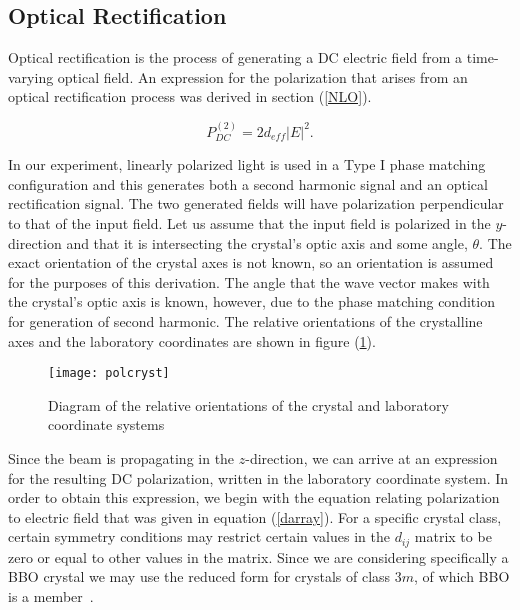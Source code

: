 \subsection{Optical Rectification}

Optical rectification is the process of generating a DC electric
field from a time-varying optical field.  An expression for the
polarization that arises from an optical rectification process was
derived in section (\ref{NLO}).

\begin{equation}\label{ORpol}
P_{DC}^{(2)}=2d_{eff} \left| E\right|^2.
\end{equation}

In our experiment, linearly polarized light is used in a Type I
phase matching configuration and this generates both a second
harmonic signal and an optical rectification signal.  The two
generated fields will have polarization perpendicular to that of
the input field. Let us assume that the input field is polarized
in the $y$-direction and that it is intersecting the crystal's
optic axis and some angle, $\theta$.  The exact orientation of the
crystal axes is not known, so an orientation is assumed for the
purposes of this derivation.  The angle that the wave vector makes
with the crystal's optic axis is known, however, due to the phase
matching condition for generation of second harmonic.  The
relative orientations of the crystalline axes and the laboratory
coordinates are shown in figure (\ref{crysorient}).

\begin{figure}
\texttt{[image: polcryst]}
\caption[Relative orientation of crystal and laboratory coordinate
systems]{Diagram of the relative orientations of the crystal and
laboratory coordinate systems}
\label{crysorient}%
\end{figure}

Since the beam is propagating in the $z$-direction, we can arrive
at an expression for the resulting DC polarization, written in the
laboratory coordinate system.  In order to obtain this expression,
we begin with the equation relating polarization to electric field
that was given in equation (\ref{darray}).  For a specific crystal
class, certain symmetry conditions may restrict certain values in
the $d_{ij}$ matrix to be zero or equal to other values in the
matrix. Since we are considering specifically a BBO crystal we may
use the reduced form for crystals of class 3$m$, of which BBO is a
member~\cite{RWBoyd}.

